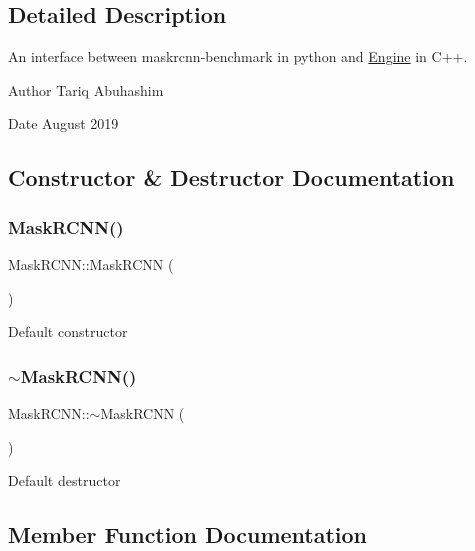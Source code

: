 \subsection{Detailed Description}
An interface between maskrcnn-\/benchmark in python and \hyperlink{classEngine}{Engine} in C++. 

\begin{DoxyAuthor}{Author}
Tariq Abuhashim 
\end{DoxyAuthor}
\begin{DoxyDate}{Date}
August 2019 
\end{DoxyDate}


\subsection{Constructor \& Destructor Documentation}
\mbox{\label{classMaskRCNN_ad50b7f9668dbe3fbd9f63a509ffaa589}} 
\subsubsection{\texorpdfstring{Mask\+R\+C\+N\+N()}{MaskRCNN()}}
{\footnotesize\ttfamily Mask\+R\+C\+N\+N\+::\+Mask\+R\+C\+NN (\begin{DoxyParamCaption}{ }\end{DoxyParamCaption})}

Default constructor \mbox{\label{classMaskRCNN_a56a6b1e8170b6cb5aceb0fcd1b529eeb}} 
\subsubsection{\texorpdfstring{$\sim$\+Mask\+R\+C\+N\+N()}{~MaskRCNN()}}
{\footnotesize\ttfamily Mask\+R\+C\+N\+N\+::$\sim$\+Mask\+R\+C\+NN (\begin{DoxyParamCaption}{ }\end{DoxyParamCaption})}

Default destructor 

\subsection{Member Function Documentation}
\mbox{\label{classMaskRCNN_a72c4683fed51fb8090971ce9baca40bb}} 
